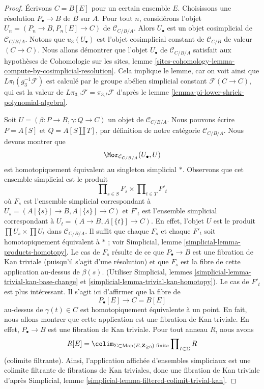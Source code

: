 \begin{proof}
Écrivons $C = B[E]$ pour un certain ensemble $E$. Choisissons une résolution
$P_\bullet \to B$ de $B$ sur $A$. Pour tout $n$, considérons l'objet
$U_n = (P_n \to B, P_n[E] \to C)$ de $\mathcal{C}_{C/B/A}$. Alors
$U_\bullet$ est un objet cosimplicial de $\mathcal{C}_{C/B/A}$. Notons que
$u_3(U_\bullet)$ est l'objet cosimplicial constant de
$\mathcal{C}_{C/B}$ de valeur $(C \to C)$. Nous allons démontrer que l'objet
$U_\bullet$ de $\mathcal{C}_{C/B/A}$ satisfait aux hypothèses de
Cohomologie sur les sites, lemme
\ref{sites-cohomology-lemma-compute-by-cosimplicial-resolution}.
Cela implique le lemme, car on voit ainsi que $L\pi_!(g_3^{-1}\mathcal{F})$
est calculé par le groupe abélien simplicial constant
$\mathcal{F}(C \to C)$, qui est la valeur de
$L\pi_{3, !}\mathcal{F} = \pi_{3, !}\mathcal{F}$ d'après le lemme
\ref{lemma-pi-lower-shriek-polynomial-algebra}.

\medskip\noindent
Soit $U = (\beta : P \to B, \gamma : Q \to C)$ un objet de
$\mathcal{C}_{C/B/A}$. Nous pouvons écrire $P = A[S]$ et
$Q = A[S \amalg T]$, par définition de notre catégorie
$\mathcal{C}_{C/B/A}$. Nous devons montrer que
$$
\Mor_{\mathcal{C}_{C/B/A}}(U_\bullet, U)
$$
est homotopiquement équivalent au singleton simplicial $*$. Observons que
cet ensemble simplicial est le produit
$$
\prod\nolimits_{s \in S} F_s \times \prod\nolimits_{t \in T} F'_t
$$
où $F_s$ est l'ensemble simplicial correspondant à
$U_s = (A[\{s\}] \to B, A[\{s\}] \to C)$
et $F'_t$ est l'ensemble simplicial correspondant à
$U_t = (A \to B, A[\{t\}] \to C)$. En effet, l'objet $U$ est le produit
$\prod U_s \times \prod U_t$ dans $\mathcal{C}_{C/B/A}$. Il suffit que
chaque $F_s$ et chaque $F'_t$ soit homotopiquement équivalent à $*$ ; voir
Simplicial, lemme \ref{simplicial-lemma-products-homotopy}. Le cas de $F_s$
résulte de ce que $P_\bullet \to B$ est une fibration de Kan triviale
(puisqu'il s'agit d'une résolution) et que $F_s$ est la fibre de cette
application au-dessus de $\beta(s)$. (Utiliser Simplicial, lemmes
\ref{simplicial-lemma-trivial-kan-base-change} et
\ref{simplicial-lemma-trivial-kan-homotopy}).
Le cas de $F'_t$ est plus intéressant. Il s'agit ici d'affirmer que la
fibre de
$$
P_\bullet[E] \longrightarrow C = B[E]
$$
au-dessus de $\gamma(t) \in C$ est homotopiquement équivalente à un point.
En fait, nous allons montrer que cette application est une fibration de Kan
triviale. En effet, $P_\bullet \to B$ est une fibration de Kan triviale.
Pour tout anneau $R$, nous avons
$$
R[E] =
\colim_{\Sigma \subset \text{Map}(E, \mathbf{Z}_{\geq 0})\text{ finite}}
\prod\nolimits_{I \in \Sigma} R
$$
(colimite filtrante). Ainsi, l'application affichée d'ensembles simpliciaux
est une colimite filtrante de fibrations de Kan triviales, donc une fibration
de Kan triviale d'après Simplicial, lemme
\ref{simplicial-lemma-filtered-colimit-trivial-kan}.
\end{proof}

